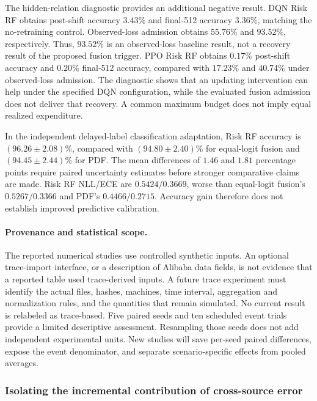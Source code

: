 The hidden-relation diagnostic provides an additional negative result.
DQN Risk RF obtains post-shift accuracy $3.43\%$ and final-512 accuracy
$3.36\%$, matching the no-retraining control. Observed-loss admission obtains
$55.76\%$ and $93.52\%$, respectively. Thus, $93.52\%$ is an observed-loss
baseline result, not a recovery result of the proposed fusion trigger.
PPO Risk RF obtains $0.17\%$ post-shift accuracy and $0.20\%$ final-512
accuracy, compared with $17.23\%$ and $40.74\%$ under observed-loss admission.
The diagnostic shows that an updating intervention can help under the specified
DQN configuration, while the evaluated fusion admission does not deliver that
recovery. A common maximum budget does not imply equal realized expenditure.

In the independent delayed-label classification adaptation, Risk RF accuracy is
$(96.26\pm2.08)\%$, compared with $(94.80\pm2.40)\%$ for equal-logit fusion
and $(94.45\pm2.44)\%$ for PDF. The mean differences of $1.46$ and $1.81$
percentage points require paired uncertainty estimates before stronger
comparative claims are made. Risk RF NLL/ECE are $0.5424/0.3669$, worse than
equal-logit fusion's $0.5267/0.3366$ and PDF's $0.4466/0.2715$. Accuracy gain
therefore does not establish improved predictive calibration.

\paragraph{Provenance and statistical scope.}
The reported numerical studies use controlled synthetic inputs. An optional
trace-import interface, or a description of Alibaba data fields, is not evidence
that a reported table used trace-derived inputs. A future trace experiment must
identify the actual files, hashes, machines, time interval, aggregation and
normalization rules, and the quantities that remain simulated. No current result
is relabeled as trace-based. Five paired seeds and ten scheduled event trials
provide a limited descriptive assessment. Resampling those seeds does not add
independent experimental units. New studies will save per-seed paired
differences, expose the event denominator, and separate scenario-specific
effects from pooled averages.

\subsubsection{Isolating the incremental contribution of cross-source error}
\label{sec:validation-cross-error}

